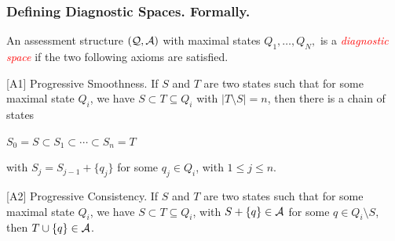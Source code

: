 \documentclass{beamer}
\def\tl{\vskip 2mm}
\def\wl{\vskip 4mm}
\def\SB{\subseteq}
\def\AAA{{\cal A}}
\def\QQQ{{\cal Q}}
\def\rtxt#1{\textcolor{red}{#1}}
\begin{document}
  \begin{frame}
  \frametitle{Defining Diagnostic Spaces. Formally.}
   \center
\begin{minipage}{10cm}\small
  \begin{definition}
  An assessment structure $(\QQQ,\AAA)$ with maximal states $Q_1,\ldots,Q_N,$  is a \rtxt{\sl diagnostic space}
  if the two following axioms are satisfied.
 \begin{roster}
\item[{[A1]}] {\sc Progressive Smoothness.} If $S$ and $T$ are two states such that  for some maximal state $Q_i$, we have $S \subset T \SB Q_i$
 with $|T\setminus S| = n$, then there is a chain of states 
\tl
\centerline{$S_0=S \subset  S_1\subset\cdots\subset S_n = T$}
\tl
\hspace{.8cm}with $S_{j} = S_{j-1} + \{q_j\}$ for some $q_j\in Q_i$, with $1\leq j\leq n$. 
\end{roster}
\begin{roster}
\item[{[A2]}] {\sc Progressive Consistency.} 
If $S$ and $T$ are two states 
such that  for some maximal state $Q_i$, we have $S \subset T\SB Q_i$, with $S + \{q\} \in \AAA$ for some $q\in Q_i\setminus S$, then 
$T\cup\{q\} \in \AAA$.
\end{roster}
\end{definition}

\end{minipage}
\end{frame}
%
\end{document}
